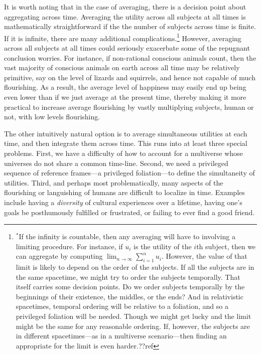 It is worth noting that in the case of averaging, there is a decision point about aggregating across time. Averaging the utility 
across all subjects at all times is mathematically straightforward if the the number of subjects across time is finite. If it is infinite,
there are many additional complications.\footnote{$^*$If the infinity is countable, then any averaging will have to 
involving a limiting procedure. For instance, if $u_i$ is the utility of the $i$th subject, then we can aggregate by computing
$\lim_{n\to\infty} \sum_{i=1}^n u_i$. However, the value of that limit is likely to depend on the order of the subjects. 
If all the subjects are in the same spacetime, we might try to order the subjects temporally. That itself carries some decision
points. Do we order subjects temporally by the beginnings of their existence, the middles, or the ends? And in relativistic
spacetimes, temporal ordering will be relative to a foliation, and so a privileged foliation will be needed. Though we might get
lucky and the limit might be the same for any reasonable ordering. If, however, the subjects are in different spacetimes---as in a 
multiverse scenario---then finding an appropriate for the limit is even harder.??ref} However, averaging across all
subjects at all times could seriously exacerbate some of the repugnant conclusion worries. For instance, if non-rational 
conscious animals count, then the vast majority of conscious animals on earth across all time may be relatively primitive,
say on the level of lizards and squirrels, and hence not capable of much flourishing. As a result, the average level of happiness
may easily end up being even lower than if we just average at the present time, thereby making it more practical to increase 
average flourishing by vastly multiplying subjects, human or not, with low levels flourishing.

The other intuitively natural option is to average simultaneous utilities at each time, and then integrate them across time. This runs into
at least three special problems. First, we have a difficulty of how to account for a multiverse whose universes do not share a 
common time-line. Second, we need a privileged sequence of reference frames---a privileged foliation---to define the 
simultaneity of utilities. Third, and perhaps most problematically, many aspects of the flourishing or languishing of 
humans are difficult to localize in time. Examples include having a \textit{diversity} of cultural experiences over a lifetime, having 
one's goals be posthumously fulfilled or frustrated, or failing to ever find a good friend.


